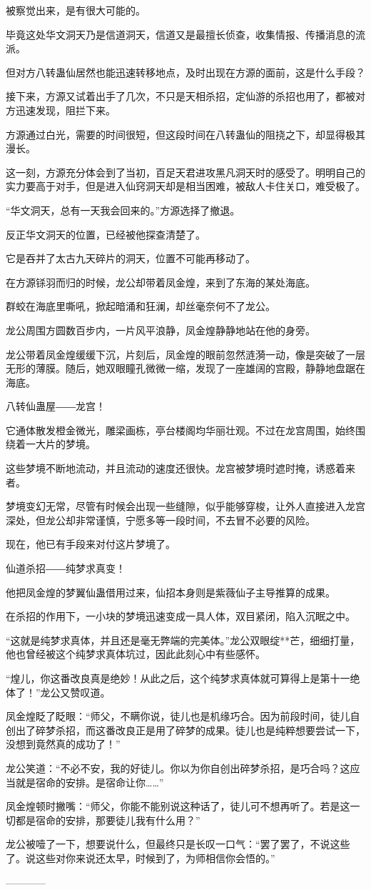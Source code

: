 \begin{this_body}
被察觉出来，是有很大可能的。

毕竟这处华文洞天乃是信道洞天，信道又是最擅长侦查，收集情报、传播消息的流派。

但对方八转蛊仙居然也能迅速转移地点，及时出现在方源的面前，这是什么手段？

接下来，方源又试着出手了几次，不只是天相杀招，定仙游的杀招也用了，都被对方迅速发现，阻拦下来。

方源通过白光，需要的时间很短，但这段时间在八转蛊仙的阻挠之下，却显得极其漫长。

这一刻，方源充分体会到了当初，百足天君进攻黑凡洞天时的感受了。明明自己的实力要高于对手，但是进入仙窍洞天却是相当困难，被敌人卡住关口，难受极了。

“华文洞天，总有一天我会回来的。”方源选择了撤退。

反正华文洞天的位置，已经被他探查清楚了。

它是吞并了太古九天碎片的洞天，位置不可能再移动了。

在方源铩羽而归的时候，龙公却带着凤金煌，来到了东海的某处海底。

群蛟在海底里嘶吼，掀起暗涌和狂澜，却丝毫奈何不了龙公。

龙公周围方圆数百步内，一片风平浪静，凤金煌静静地站在他的身旁。

龙公带着凤金煌缓缓下沉，片刻后，凤金煌的眼前忽然涟漪一动，像是突破了一层无形的薄膜。随后，她双眼瞳孔微微一缩，发现了一座雄阔的宫殿，静静地盘踞在海底。

八转仙蛊屋――龙宫！

它通体散发橙金微光，雕梁画栋，亭台楼阁均华丽壮观。不过在龙宫周围，始终围绕着一大片的梦境。

这些梦境不断地流动，并且流动的速度还很快。龙宫被梦境时遮时掩，诱惑着来者。

梦境变幻无常，尽管有时候会出现一些缝隙，似乎能够穿梭，让外人直接进入龙宫深处，但龙公却非常谨慎，宁愿多等一段时间，不去冒不必要的风险。

现在，他已有手段来对付这片梦境了。

仙道杀招――纯梦求真变！

他把凤金煌的梦翼仙蛊借用过来，仙招本身则是紫薇仙子主导推算的成果。

在杀招的作用下，一小块的梦境迅速变成一具人体，双目紧闭，陷入沉眠之中。

“这就是纯梦求真体，并且还是毫无弊端的完美体。”龙公双眼绽**芒，细细打量，他也曾经被这个纯梦求真体坑过，因此此刻心中有些感怀。

“煌儿，你这番改良真是绝妙！从此之后，这个纯梦求真体就可算得上是第十一绝体了！”龙公又赞叹道。

凤金煌眨了眨眼：“师父，不瞒你说，徒儿也是机缘巧合。因为前段时间，徒儿自创出了碎梦杀招，而这番改良正是用了碎梦的成果。徒儿也是纯粹想要尝试一下，没想到竟然真的成功了！”

龙公笑道：“不必不安，我的好徒儿。你以为你自创出碎梦杀招，是巧合吗？这应当就是宿命的安排。是宿命让你……”

凤金煌顿时撇嘴：“师父，你能不能别说这种话了，徒儿可不想再听了。若是这一切都是宿命的安排，那要徒儿我有什么用？”

龙公被噎了一下，想要说什么，但最终只是长叹一口气：“罢了罢了，不说这些了。说这些对你来说还太早，时候到了，为师相信你会悟的。”

------------

\end{this_body}

